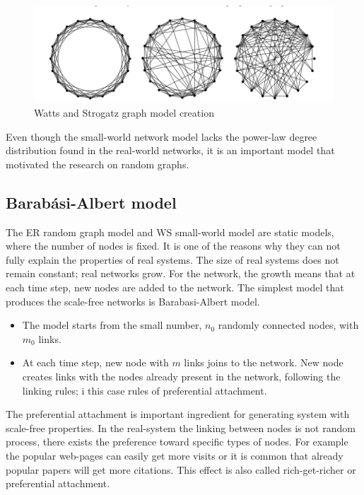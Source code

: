 \begin{figure}[h!]
	\centering
	\includegraphics[width=0.9\linewidth]{figures/methodology/ws_graph}
	\caption{Watts and Strogatz graph model creation}
	\label{fig:erdist}
\end{figure}

Even though the small-world network model lacks the power-law degree distribution found in the real-world networks, it is an important model that motivated the research on random graphs. 

\subsection{Barab\' {a}si-Albert model}

The ER random graph model and WS small-world model are static models, where the number of nodes is fixed. It is one of the reasons why they can not fully explain the properties of real systems. The size of real systems does not remain constant; real networks grow. For the network, the growth means that at each time step, new nodes are added to the network. The simplest model that produces the scale-free networks is Barabasi-Albert model.

\begin{itemize}
	\item The model starts from the small number, $n_0$ randomly connected nodes, with $m_0$ links.
	\item At each time step, new node with $m$ links joins to the network. New node creates links with the nodes already present in the network, following the linking rules; i this case rules of preferential attachment. 
\end{itemize}
 
The preferential attachment is important ingredient for generating system with scale-free properties. In the real-system the linking between nodes is not random process, there exists the preference toward specific types of nodes. For example the popular web-pages can easily get more visits or it is common that already popular papers will get more citations. This effect is also called rich-get-richer or preferential attachment.

